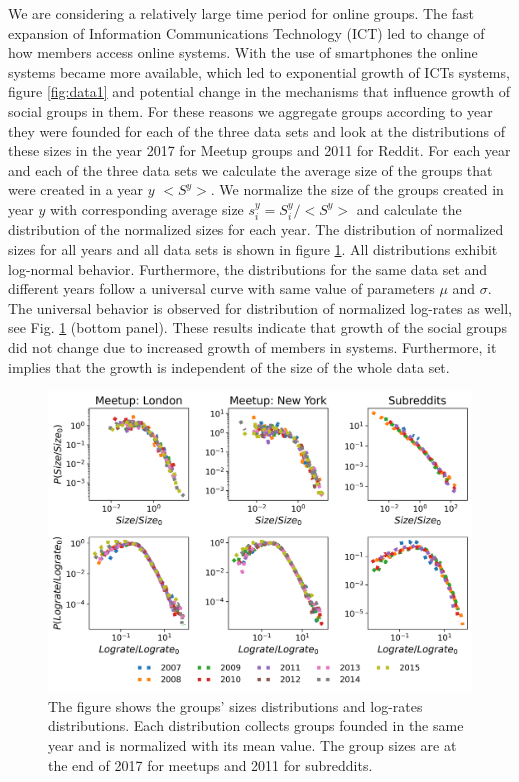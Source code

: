 We are considering a relatively large time period for online groups. The fast expansion of Information Communications Technology (ICT) led to change of how members access online systems. With the use of smartphones the online systems became more available, which led to exponential growth of ICTs systems, figure \ref{fig:data1} and potential change in the mechanisms that influence growth of social groups in them. For these reasons we aggregate groups according to year they were founded for each of the three data sets and look at the distributions of these sizes in the year 2017 for Meetup groups and 2011 for Reddit. For each year and each of the three data sets we calculate the average size of the groups that were created in a year $y$ $<S^{y}>$. We normalize the size of the groups created in year $y$ with corresponding average size $s^{y}_{i}=S^{y}_{i}/<S^{y}>$ and calculate the distribution of the normalized sizes for each year. The distribution of normalized sizes for all years and all data sets is shown in figure \ref{fig:scale}. All distributions exhibit log-normal behavior. Furthermore, the distributions for the same data set and different years follow a universal curve with same value of parameters $\mu$ and $\sigma$. The universal behavior is observed for distribution of normalized log-rates as well, see Fig. \ref{fig:scale} (bottom panel). These results indicate that growth of the social groups did not change due to increased growth of members in systems. Furthermore, it implies that the growth is independent of the size of the whole data set.   

\begin{figure}[!h]
	\centering
	\includegraphics[width=0.8\linewidth]{Figures/figures/Fig1.png}
	\caption{The figure shows the groups' sizes distributions and log-rates distributions. Each distribution collects groups founded in the same year and is normalized with its mean value. The group sizes are at the end of 2017 for meetups and 2011 for subreddits. }
	\label{fig:scale}
\end{figure}

